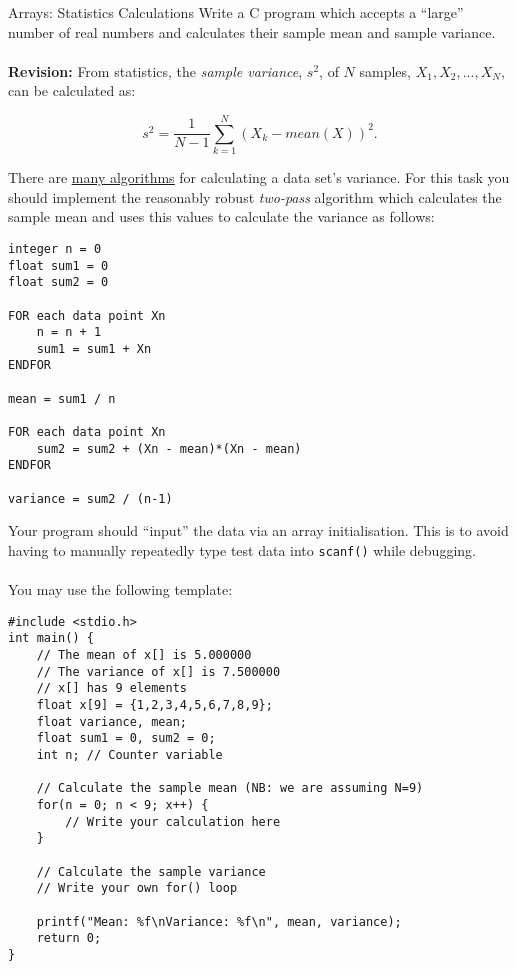 \documentclass{lab}
\begin{document}
\pagebreak
\begin{task}{Arrays: Statistics Calculations}{}
Write a C program which accepts a ``large'' number of real numbers and calculates their sample mean and sample variance.
\\~\\
\textbf{Revision:} From statistics, the \textit{sample variance}, $s^2$, of $N$ samples, $X_1, X_2, ... , X_N$, can be calculated as:

\begin{equation}\label{eq:var}
s^2 = \frac{1}{N-1}\sum_{k=1}^{N}(X_k - mean(X))^2.
\end{equation}

There are \underline{\href{https://en.wikipedia.org/wiki/Algorithms_for_calculating_variance}{many algorithms}} for calculating a data set's variance. For this task you should implement the reasonably robust \textit{two-pass} algorithm which calculates the sample mean and uses this values to calculate the variance as follows:
\begin{lstlisting}[style=pseudo]
integer n = 0
float sum1 = 0
float sum2 = 0

FOR each data point Xn
	n = n + 1
	sum1 = sum1 + Xn
ENDFOR

mean = sum1 / n

FOR each data point Xn
	sum2 = sum2 + (Xn - mean)*(Xn - mean)
ENDFOR

variance = sum2 / (n-1)
\end{lstlisting}

Your program should ``input'' the data via an array initialisation. This is to avoid having to manually repeatedly type test data into \texttt{scanf()} while debugging.
\\~\\
You may use the following template:
\begin{lstlisting}[style=Ctable]
#include <stdio.h>
int main() {
	// The mean of x[] is 5.000000
	// The variance of x[] is 7.500000
	// x[] has 9 elements
	float x[9] = {1,2,3,4,5,6,7,8,9};
	float variance, mean;
	float sum1 = 0, sum2 = 0;
	int n; // Counter variable
	
	// Calculate the sample mean (NB: we are assuming N=9)
	for(n = 0; n < 9; x++) {
		// Write your calculation here
	}	
	
	// Calculate the sample variance
	// Write your own for() loop
	
	printf("Mean: %f\nVariance: %f\n", mean, variance);
	return 0;
}
\end{lstlisting}
\end{task}
\end{document}
